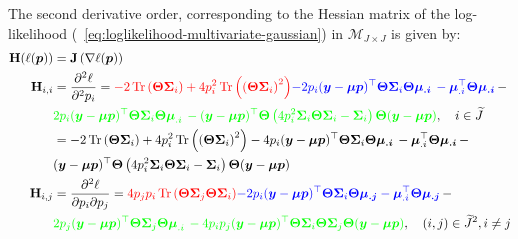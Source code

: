 \documentclass[long, final]{jobim}
\DeclareMathOperator*{\Tr}{Tr}
\begin{document}
The second derivative order, corresponding to the Hessian matrix of the log-likelihood (\equationname~\ref{eq:loglikelihood-multivariate-gaussian}) in $\mathcal{M}_{J \times J}$ is given by:
\begin{equation}
    \label{eq:hessian-log-likelihood-unconstrained}
\begin{aligned}
\mathbf{H}(\ell(\boldsymbol{p})) &= \mathbf{J}\left( \nabla \ell (\boldsymbol{p})\right)\\
\mathbf{H}_{i,i}& =
   \frac{\partial^2 \ell}{\partial^2 p_i} =
\textcolor{red}{-2\Tr \left(\boldsymbol{\Theta}\boldsymbol{\Sigma}_i\right) + 4p_i^2 \Tr \left(\left(\boldsymbol{\Theta}\boldsymbol{\Sigma}_i\right)^2\right)}
\textcolor{blue}{-2p_i(\boldsymbol{y} - \boldsymbol{\mu} \boldsymbol{p})^\top\boldsymbol{\Theta} \boldsymbol{\Sigma}_i \boldsymbol{\Theta} \boldsymbol{\mu_{.i}}\, - \boldsymbol{\mu}_{.i}^\top\boldsymbol{\Theta} \boldsymbol{\mu_{.i}}} \, - \\
& \textcolor{green}{2p_i (\boldsymbol{y} - \boldsymbol{\mu} \boldsymbol{p})^\top \boldsymbol{\Theta}\boldsymbol{\Sigma}_i\boldsymbol{\Theta}\boldsymbol{\mu}_{.i} \, -
(\boldsymbol{y} - \boldsymbol{\mu} \boldsymbol{p})^\top\boldsymbol{\Theta} \left(4p_i^2 \boldsymbol{\Sigma}_i \boldsymbol{\Theta} \boldsymbol{\Sigma}_i - \boldsymbol{\Sigma}_i \right)\boldsymbol{\Theta} (\boldsymbol{y} - \boldsymbol{\mu} \boldsymbol{p})}, \quad i \in \widetilde{J} \\
& = -2\Tr \left(\boldsymbol{\Theta}\boldsymbol{\Sigma}_i\right) + 4p_i^2 \Tr \left(\left(\boldsymbol{\Theta}\boldsymbol{\Sigma}_i\right)^2\right)
-4p_i(\boldsymbol{y} - \boldsymbol{\mu} \boldsymbol{p})^\top\boldsymbol{\Theta} \boldsymbol{\Sigma}_i \boldsymbol{\Theta} \boldsymbol{\mu_{.i}}\, - \boldsymbol{\mu}_{.i}^\top\boldsymbol{\Theta} \boldsymbol{\mu_{.i}} \, - \\
& (\boldsymbol{y} - \boldsymbol{\mu} \boldsymbol{p})^\top\boldsymbol{\Theta} \left(4p_i^2 \boldsymbol{\Sigma}_i \boldsymbol{\Theta} \boldsymbol{\Sigma}_i - \boldsymbol{\Sigma}_i \right)\boldsymbol{\Theta} (\boldsymbol{y} - \boldsymbol{\mu} \boldsymbol{p})\\
\mathbf{H}_{i,j} &=
   \frac{\partial^2 \ell}{\partial p_i \partial p_j} =
\textcolor{red}{4p_j p_i \Tr \left(\boldsymbol{\Theta}\boldsymbol{\Sigma}_j \boldsymbol{\Theta}\boldsymbol{\Sigma}_i \right)}
\textcolor{blue}{-2p_i(\boldsymbol{y} - \boldsymbol{\mu} \boldsymbol{p})^\top\boldsymbol{\Theta} \boldsymbol{\Sigma}_i \boldsymbol{\Theta} \boldsymbol{\mu_{.j}} - \boldsymbol{\mu}_{.i}^\top\boldsymbol{\Theta} \boldsymbol{\mu_{.j}}} \, - \\
& \textcolor{green}{2p_j (\boldsymbol{y} - \boldsymbol{\mu} \boldsymbol{p})^\top \boldsymbol{\Theta}\boldsymbol{\Sigma}_j\boldsymbol{\Theta} \boldsymbol{\mu}_{.i}\, -
4p_ip_j(\boldsymbol{y} - \boldsymbol{\mu} \boldsymbol{p})^\top\boldsymbol{\Theta}\boldsymbol{\Sigma}_i \boldsymbol{\Theta} \boldsymbol{\Sigma}_j \boldsymbol{\Theta} (\boldsymbol{y} - \boldsymbol{\mu} \boldsymbol{p})}, \quad (i,j) \in \widetilde{J}^2, i \neq j
  \end{aligned}
\end{equation}
\end{document}
